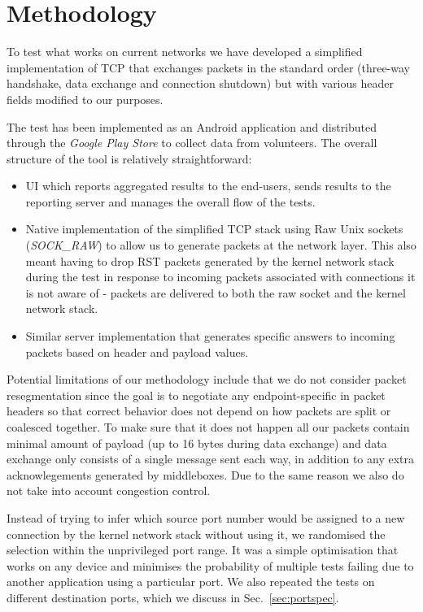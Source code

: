 \documentclass{sig-alternate-10pt}
\begin{document}
\section{Methodology}

To test what works on current networks we have developed a simplified implementation of TCP that exchanges packets in the standard order (three-way handshake, data exchange and connection shutdown) but with various header fields modified to our purposes.

The test has been implemented as an Android application and distributed through the \emph{Google Play Store} to collect data from volunteers. The overall structure of the tool is relatively straightforward:
\begin{itemize}
    \item UI which reports aggregated results to the end-users, sends results to the reporting server and manages the overall flow of the tests.
    \item Native implementation of the simplified TCP stack using Raw Unix sockets (\emph{SOCK\_RAW}) to allow us to generate packets at the network layer. This also meant having to drop RST packets generated by the kernel network stack during the test in response to incoming packets associated with connections it is not aware of - packets are delivered to both the raw socket and the kernel network stack.
    \item Similar server implementation that generates specific answers to incoming packets based on header and payload values.
\end{itemize}

Potential limitations of our methodology include that we do not consider packet resegmentation since the goal is to negotiate any endpoint-specific in packet headers so that correct behavior does not depend on how packets are split or coalesced together. To make sure that it does not happen all our packets contain minimal amount of payload (up to 16 bytes during data exchange) and data exchange only consists of a single message sent each way, in addition to any extra acknowlegements generated by middleboxes. Due to the same reason we also do not take into account congestion control.

Instead of trying to infer which source port number would be assigned to a new connection by the kernel network stack without using it, we randomised the selection within the unprivileged port range. It was a simple optimisation that works on any device and minimises the probability of multiple tests failing due to another application using a particular port. We also repeated the tests on different destination ports, which we discuss in Sec.~\ref{sec:portspec}.
\end{document}
